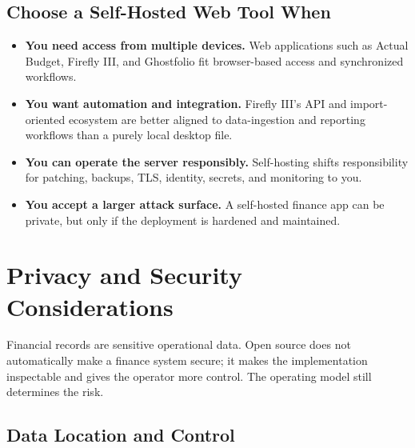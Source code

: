 \documentclass[11pt]{article}
\newcommand{\decision}[1]{\textbf{\color{accent}#1}}
\begin{document}
\subsection{Choose a Self-Hosted Web Tool When}

\begin{itemize}
  \item \decision{You need access from multiple devices.} Web applications such as Actual Budget, Firefly III, and Ghostfolio fit browser-based access and synchronized workflows.\cite{actual-home,firefly-docs,ghostfolio-home}
  \item \decision{You want automation and integration.} Firefly III's API and import-oriented ecosystem are better aligned to data-ingestion and reporting workflows than a purely local desktop file.\cite{firefly-github,firefly-docs}
  \item \decision{You can operate the server responsibly.} Self-hosting shifts responsibility for patching, backups, TLS, identity, secrets, and monitoring to you.
  \item \decision{You accept a larger attack surface.} A self-hosted finance app can be private, but only if the deployment is hardened and maintained.
\end{itemize}


\section{Privacy and Security Considerations}

Financial records are sensitive operational data. Open source does not automatically make a finance system secure; it makes the implementation inspectable and gives the operator more control. The operating model still determines the risk.

\subsection{Data Location and Control}
\end{document}
